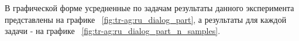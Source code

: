 В графической форме усредненные по задачам результаты данного эксперимента представлены на графике ~\ref{fig:tr-ag:ru_dialog_part}, а результаты для каждой задачи - на графике ~\ref{fig:tr-ag:ru_dialog_part_n_samples}. 


